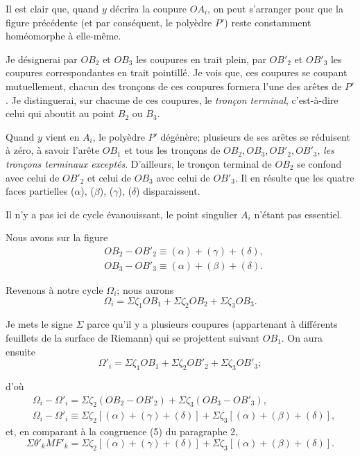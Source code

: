 \documentclass{article}
\begin{document}
Il est clair que, quand $y$ décrira la coupure $OA_{i}$, on peut s'arranger pour que la figure précédente (et par conséquent, le polyèdre $P'$) reste constamment homéomorphe à elle-même.

Je désignerai par $OB_{2}$ et $OB_{3}$ les coupures en trait plein, par $OB'_{2}$ et $OB'_{3}$ les coupures correspondantes en trait pointillé. Je vois que, ces coupures se coupant mutuellement, chacun des tronçons de ces coupures formera l'une des arêtes de $P'$. Je distinguerai, sur chacune de ces coupures, le \emph{tronçon terminal}, c'est-à-dire celui qui aboutit au point $B_{2}$ ou $B_{3}$.

Quand $y$ vient en $A_{i}$, le polyèdre $P'$ dégénère; plusieurs de ses arêtes se réduisent à zéro, à savoir l'arête $OB_{1}$ et tous les tronçons de $OB_{2}, OB_{3}, OB'_{2}, OB'_{3}$, \emph{les tronçons terminaux exceptés}. D'ailleurs, le tronçon terminal de $OB_{2}$ se confond avec celui de $OB'_{2}$ et celui de $OB_{3}$ avec celui de $OB'_{3}$. Il en résulte que les quatre faces partielles ($\alpha$), ($\beta$), ($\gamma$), ($\delta$) disparaissent.

Il n'y a pas ici de cycle évanouissant, le point singulier $A_{i}$ n'étant pas essentiel.

Nous avons sur la figure
\[ \begin{aligned} &OB_{2} - OB'_{2} \equiv (\alpha) + (\gamma) + (\delta),\\ &OB_{3} - OB'_{3} \equiv (\alpha) + (\beta) + (\delta). \end{aligned} \]

Revenons à notre cycle $\Omega_{i}$; nous aurons
\[ \Omega_{i} = \Sigma \zeta_{1} OB_{1} + \Sigma \zeta_{2} OB_{2} + \Sigma \zeta_{3} OB_{3}. \]

Je mets le signe $\Sigma$ parce qu'il y a plusieurs coupures (appartenant à différents feuillets de la surface de Riemann) qui se projettent suivant $OB_{1}$. On aura ensuite
\[ \Omega'_{i} = \Sigma \zeta_{1} OB_{1} + \Sigma \zeta_{2} OB'_{2} + \Sigma \zeta_{3} OB'_{3}; \]

d'où
\[ \begin{aligned} &\Omega_{i} - \Omega'_{i} = \Sigma \zeta_{2}(OB_{2} - OB'_{2}) + \Sigma \zeta_{3}(OB_{3} - OB'_{3}),\\ &\Omega_{i} - \Omega'_{i} \equiv \Sigma \zeta_{2}[(\alpha) + (\gamma) + (\delta)] + \Sigma \zeta_{3}[(\alpha) + (\beta) + (\delta)], \end{aligned} \]
et, en comparant à la congruence (5) du paragraphe 2,
\[ \Sigma \theta'_{k} MF'_{k} = \Sigma \zeta_{2}[(\alpha) + (\gamma) + (\delta)] + \Sigma \zeta_{3}[(\alpha) + (\beta) + (\delta)]. \]
\end{document}
